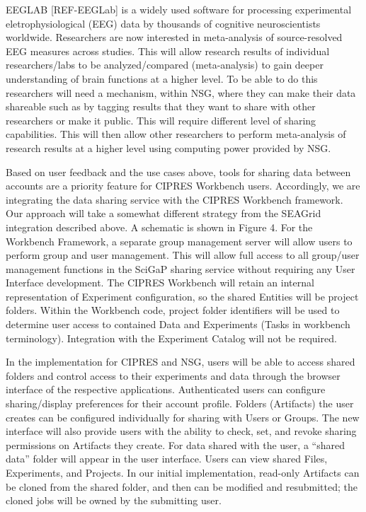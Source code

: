 \documentclass[sigconf]{acmart}
\begin{document}
EEGLAB [REF-EEGLab] is a widely used software for processing experimental eletrophysiological (EEG) data by thousands of cognitive neuroscientists worldwide. Researchers are now interested in meta-analysis of source-resolved EEG measures across studies. This will allow research results of individual researchers/labs to be analyzed/compared (meta-analysis) to gain deeper understanding of brain functions at a higher level. To be able to do this researchers will need a mechanism, within NSG, where they can make their data shareable such as by tagging results that they want to share with other researchers or make it public. This will require different level of sharing capabilities. This will then allow other researchers to perform meta-analysis of research results at a higher level using computing power provided by NSG.

Based on user feedback and the use cases above, tools for sharing data between accounts  are a priority feature for CIPRES Workbench users. Accordingly, we are integrating the data sharing service with the CIPRES Workbench framework. Our approach will take a somewhat different strategy from the SEAGrid integration described above. A schematic is shown in Figure 4. For the Workbench Framework, a separate group management server will allow users to perform group and user management. This will allow full access to all group/user management functions in the SciGaP sharing service without requiring any User Interface development. The CIPRES Workbench will retain an internal representation of Experiment configuration, so the shared Entities will be project folders.  Within the Workbench code, project folder identifiers will be used to determine user access to contained Data and Experiments (Tasks in workbench terminology). Integration with the Experiment Catalog will not be required.

In the implementation for CIPRES and NSG, users will be able to access shared folders and control access to their experiments and data through the browser interface of the respective applications. Authenticated users can configure sharing/display preferences for their account profile. Folders (Artifacts) the user creates can be configured individually for sharing with Users or Groups. The new interface will also provide users with the ability to check, set, and revoke sharing permissions on Artifacts they create. For data shared with the user, a “shared data” folder will appear in the user interface. Users can view shared Files, Experiments, and Projects. In our initial implementation, read-only Artifacts can be cloned from the shared folder, and then can be modified and resubmitted; the cloned jobs will be owned by the submitting user.
\end{document}
